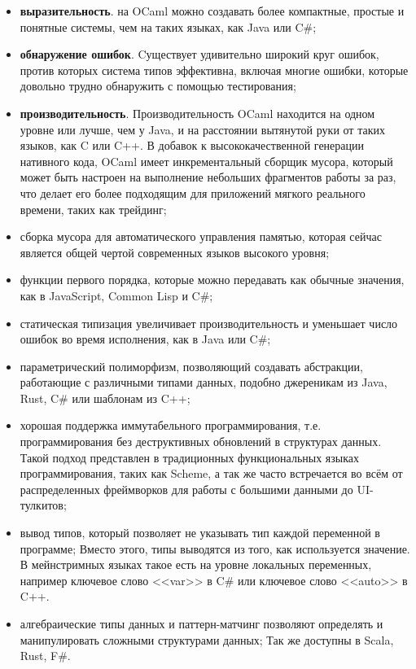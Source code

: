 \begin{itemize}
      \item \textbf{выразительность}. на OCaml можно создавать более компактные, простые и понятные системы,
            чем на таких языках, как Java или C\#;
      \item \textbf{обнаружение ошибок}. Cуществует удивительно
            широкий круг ошибок, против которых система типов эффективна, включая многие ошибки, которые довольно трудно
            обнаружить с помощью тестирования;
      \item \textbf{производительность}. Производительность OCaml находится на одном уровне или лучше,
            чем у Java, и на расстоянии вытянутой руки от таких языков, как C или C++. В добавок к высококачественной генерации нативного кода,
            OCaml имеет инкрементальный сборщик мусора, который может быть настроен на выполнение небольших
            фрагментов работы за раз, что делает его более подходящим для приложений мягкого реального времени,
            таких как трейдинг;
      \item сборка мусора для автоматического управления памятью, которая сейчас является общей чертой современных языков высокого уровня;
      \item функции первого порядка, которые можно передавать как обычные значения, как в JavaScript, Common Lisp и C\#;
      \item статическая типизация увеличивает производительность и уменьшает число ошибок во время исполнения, как в Java или C\#;
      \item параметрический полиморфизм, позволяющий создавать абстракции, работающие с различными типами данных,
            подобно джереникам из Java, Rust, C\# или шаблонам из C++;
      \item хорошая поддержка иммутабельного программирования, т.е. программирования без деструктивных обновлений в структурах данных.
            Такой подход представлен в традиционных функциональных языках программирования, таких как Scheme, а так же часто встречается
            во всём от распределенных фреймворков для работы с большими данными до UI-тулкитов;
      \item вывод типов, который позволяет не указывать тип каждой переменной в программе;
            Вместо этого, типы выводятся из того, как используется значение. В мейнстримных языках
            такое есть на уровне локальных переменных, например ключевое слово <<var>> в C\# или ключевое слово <<auto>> в C++.
      \item алгебраические типы данных и паттерн-матчинг позволяют определять и манипулировать сложными структурами данных;
            Так же доступны в Scala, Rust, F\#.

\end{itemize}

